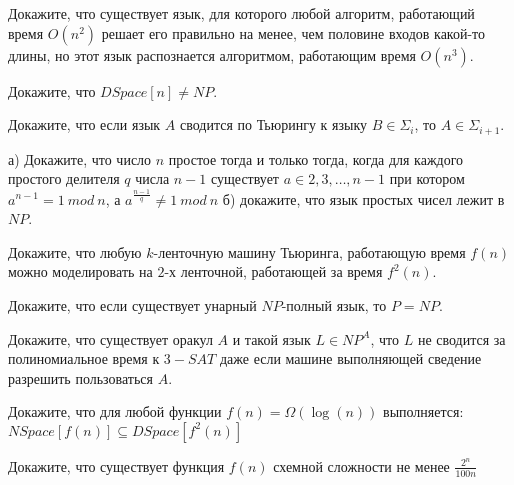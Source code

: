 \setcounter{curtask}{23}


\begin{task}
    Докажите, что существует язык, для которого любой алгоритм, работающий время
    $O(n^2)$ решает его правильно на менее, чем половине входов какой-то длины, но
    этот язык распознается алгоритмом, работающим время $O(n^3)$.
\end{task}

\begin{task}
    Докажите, что $DSpace[n] \ne NP$.
\end{task}

\begin{task}
    Докажите, что если язык $A$ сводится по Тьюрингу к языку $B \in \Sigma_{i}$, то
    $A \in \Sigma_{i + 1}$.
\end{task}

\breakline

\begin{ptask}{4}
    а) Докажите, что число $n$ простое тогда и только тогда, когда для каждого
    простого делителя $q$ числа $n - 1$ существует $a \in {2, 3, \dots, n - 1}$ при котором
    $a^{n - 1} = 1~mod~n$, а $a^{\frac{n - 1}{q}} \ne 1~mod~n$
    б) докажите, что язык простых чисел лежит в $NP$.
\end{ptask}

\begin{ptask}{8}
    Докажите, что любую $k$-ленточную машину Тьюринга, работающую время $f(n)$ можно
    моделировать на $2$-х ленточной, работающей за время $f^2(n)$.
\end{ptask}


\begin{ptask}{12}
	Докажите, что если существует унарный $NP$-полный язык, то $P = NP$.
\end{ptask}

\begin{ptask}{13}
    Докажите, что существует оракул $A$ и такой язык $L \in NP^A$, что $L$ не
    сводится за полиномиальное время к $3-SAT$ даже если машине выполняющей сведение
    разрешить пользоваться $A$.
\end{ptask}

\begin{ptask}{17}
    Докажите, что для любой функции $f(n) = \Omega(\log(n))$ выполняется:
    $NSpace[f(n)] \subseteq DSpace[f^2(n)]$
\end{ptask}

\begin{ptask}{18}
    Докажите, что существует функция $f(n)$ схемной сложности не менее $\frac{2^n}{100n}$
\end{ptask}

